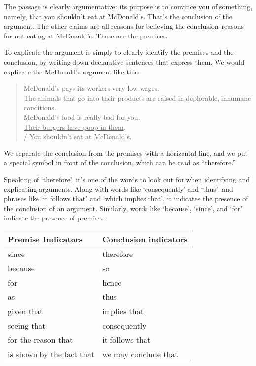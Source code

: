 The passage is clearly argumentative: its purpose is to convince you of something, namely, that
you shouldn't eat at McDonald's. That's the conclusion of the argument. The other claims are all
reasons for believing the conclusion--reasons for not eating at McDonald's. Those are the
premises.

To explicate the argument is simply to clearly identify the premises and the conclusion, by writing
down declarative sentences that express them. We would explicate the McDonald's argument like
this:

\begin{quotation}
McDonald's pays its workers very low wages. \\
The animals that go into their products are raised in deplorable, inhumane conditions. \\
McDonald's food is really bad for you. \\
\underline{Their burgers have poop in them}. \\
/ You shouldn't eat at McDonald's.
\end{quotation}

We separate the conclusion from the premises with a horizontal line, and we put a special symbol
in front of the conclusion, which can be read as ``therefore.''

Speaking of `therefore', it's one of the words to look out for when identifying and explicating
arguments. Along with words like `consequently' and `thus', and phrases like `it follows that' and
`which implies that', it indicates the presence of the conclusion of an argument. Similarly, words
like `because', `since', and `for' indicate the presence of premises.\\


\begin{table}[htp]
\begin{tabular}{|l|l|}
\hline
\textbf{Premise Indicators}        & \textbf{Conclusion indicators} \\
\hline
since                     & therefore             \\
because                   & so                    \\
for                       & hence                 \\
as                        & thus                  \\
given that                & implies that          \\
seeing that               & consequently          \\
for the reason that       & it follows that       \\
is shown by the fact that & we may conclude that \\
\hline
\end{tabular}
\end{table}

